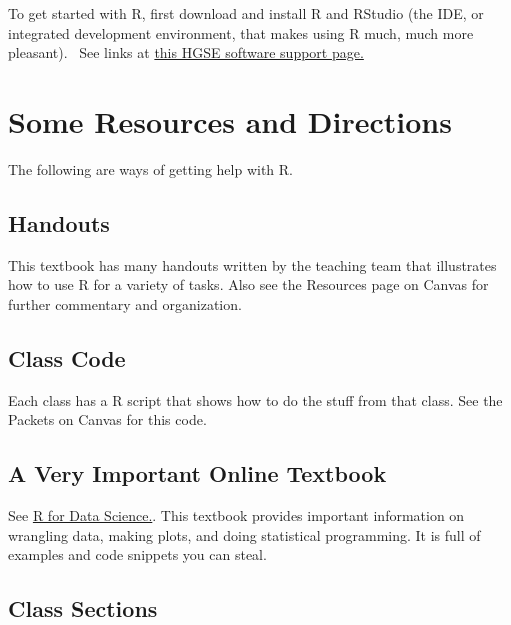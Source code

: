 \documentclass[
  letterpaper,
  DIV=11,
  numbers=noendperiod]{scrreprt}
\begin{document}

To get started with R, first download and install R and RStudio (the
IDE, or integrated development environment, that makes using R much,
much more pleasant).~ See links at
\href{https://its.gse.harvard.edu/research-software-support}{this HGSE
software support page.}

\section*{Some Resources and
Directions}\label{some-resources-and-directions}


The following are ways of getting help with R.

\subsection*{Handouts}\label{handouts}

This textbook has many handouts written by the teaching team that
illustrates how to use R for a variety of tasks. Also see the Resources
page on Canvas for further commentary and organization.

\subsection*{Class Code}\label{class-code}

Each class has a R script that shows how to do the stuff from that
class. See the Packets on Canvas for this code.

\subsection*{A Very Important Online
Textbook}\label{a-very-important-online-textbook}

See \href{http://r4ds.had.co.nz/}{R for Data Science.}. This textbook
provides important information on wrangling data, making plots, and
doing statistical programming. It is full of examples and code snippets
you can steal.

\subsection*{Class Sections}\label{class-sections}
\end{document}
